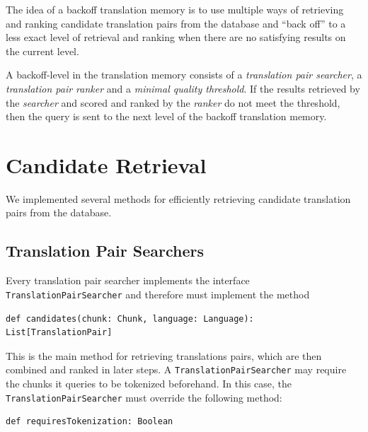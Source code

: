 The idea of a backoff translation memory is to use multiple ways of
retrieving and ranking candidate translation pairs from the database and
``back off'' to a less exact level of retrieval and ranking when there
are no satisfying results on the current level.

A backoff-level in the translation memory consists of a \emph{translation pair
searcher}, a \emph{translation pair ranker} and a \emph{minimal quality
threshold}. 
If the results retrieved by the \emph{searcher} and scored and ranked by
the \emph{ranker} do not meet the threshold, then the query is sent to the 
next level of the backoff translation memory. 


\section{Candidate Retrieval}
\label{sec:candidate_retrieval}

We implemented several methods for efficiently retrieving candidate
translation pairs from the database. 


\subsection{Translation Pair Searchers}

Every translation pair searcher implements the interface {\tt TranslationPairSearcher} and therefore must implement the method 

\vspace*{0.5em}

\begin{lstlisting}
def candidates(chunk: Chunk, language: Language): List[TranslationPair]
\end{lstlisting}

This is the main method for retrieving translations pairs, which are then combined and ranked in later steps. A {\tt TranslationPairSearcher} may require the chunks it queries to be tokenized beforehand. In this case, the {\tt TranslationPairSearcher} must override the following method:

\vspace*{0.5em}

\begin{lstlisting}
def requiresTokenization: Boolean
\end{lstlisting}

